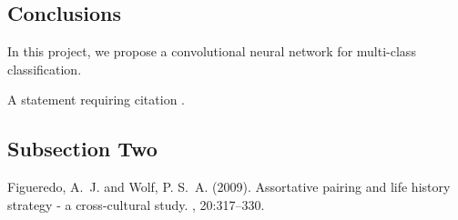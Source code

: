 \documentclass[twoside,twocolumn]{article}
\begin{document}
\subsection{Conclusions}

In this project, we propose a convolutional neural network for multi-class classification. 







A statement requiring citation \cite{Figueredo:2009dg}.


\blindtext %

\subsection{Subsection Two}

\blindtext %


\begin{thebibliography}{99} %

Figueredo, A.~J. and Wolf, P. S.~A. (2009).
\newblock Assortative pairing and life history strategy - a cross-cultural
  study.
, 20:317--330.
 
\end{thebibliography}

\end{document}
